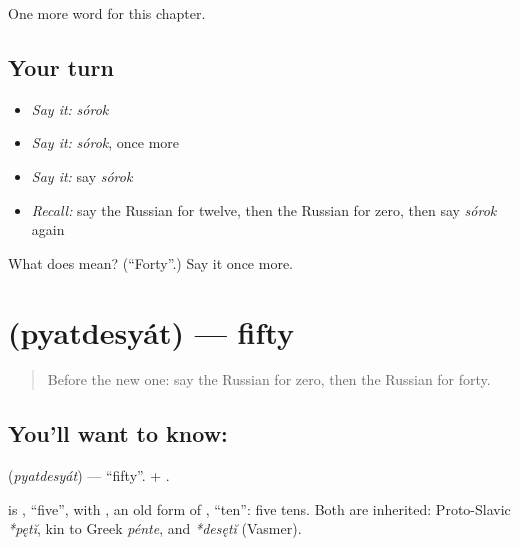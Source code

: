 \begin{grammarlens}[title={What you've built}]
One more word for this chapter.
\end{grammarlens}

\subsection*{Your turn}
\begin{itemize}
\raggedright
  \item \emph{Say it:} \emph{sórok}
  \item \emph{Say it:} \emph{sórok}, once more
  \item \emph{Say it:} say \emph{sórok}
  \item \emph{Recall:} say the Russian for twelve, then the Russian for zero, then say \emph{sórok} again
\end{itemize}

\begin{tcolorbox}[breakable,colback=teal!4,colframe=teal!35!black,title={Before you move on}]
What does  mean? (\textquotedblleft{}Forty\textquotedblright{}.) Say it once more.
\end{tcolorbox}
\section[\texorpdfstring{\ru{пятьдесят} (pyatdesyát)}{пятьдесят (pyatdesyát)}]{ (pyatdesyát) — fifty}

\label{lesson:RU-C76-fifty}



\begin{quote}
Before the new one: say the Russian for zero, then the Russian for forty.
\end{quote}

\subsection*{You'll want to know: }
\textbf{} (\emph{pyatdesyát}) — \textquotedblleft{}fifty\textquotedblright{}. \textbf{} + \textbf{}.

\begin{cousinweb}
\textbf{} is \emph{}, \textquotedblleft{}five\textquotedblright{}, with \emph{}, an old form of \emph{}, \textquotedblleft{}ten\textquotedblright{}: five tens. Both are inherited: Proto-Slavic \emph{*pętĭ}, kin to Greek \emph{pénte}, and \emph{*desętĭ} (Vasmer).
\end{cousinweb}


